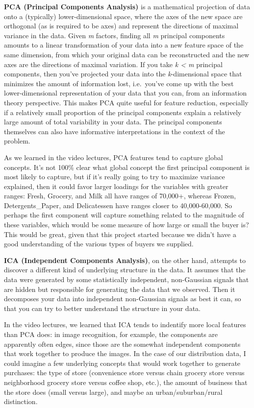 \documentclass{article}
\begin{document}
    \textbf{PCA (Principal Components Analysis)} is a mathematical
projection of data onto a (typically) lower-dimensional space, where the
axes of the new space are orthogonal (as is required to be axes) and
represent the directions of maximal variance in the data. Given \emph{m}
factors, finding all \emph{m} principal components amounts to a linear
transformation of your data into a new feature space of the same
dimension, from which your original data can be reconstructed and the
new axes are the directions of maximal variation. If you take \emph{k
\textless{} m} principal components, then you've projected your data
into the \emph{k}-dimensional space that minimizes the amount of
information lost, i.e.~you've come up with the best lower-dimensional
representation of your data that you can, from an information theory
perspective. This makes PCA quite useful for feature reduction,
especially if a relatively small proportion of the principal components
explain a relatively large amount of total variability in your data. The
principal components themselves can also have informative
interpretations in the context of the problem.

As we learned in the video lectures, PCA features tend to capture global
concepts. It's not 100\% clear what global concept the first principal
component is most likely to capture, but if it's really going to try to
maximize variance explained, then it could favor larger loadings for the
variables with greater ranges: Fresh, Grocery, and Milk all have ranges
of 70,000+, whereas Frozen, Detergents\_Paper, and Delicatessen have
ranges closer to 40,000-60,000. So perhaps the first component will
capture something related to the magnitude of these variables, which
would be some measure of how large or small the buyer is? This would be
great, given that this project started because we didn't have a good
understanding of the various types of buyers we supplied.

    \textbf{ICA (Independent Components Analysis)}, on the other hand,
attempts to discover a different kind of underlying structure in the
data. It assumes that the data were generated by some statistically
independent, non-Gaussian signals that are hidden but responsible for
generating the data that we observed. Then it decomposes your data into
independent non-Gaussian signals as best it can, so that you can try to
better understand the structure in your data.

In the video lectures, we learned that ICA tends to indentify more local
features than PCA does: in image recognition, for example, the
components are apparently often edges, since those are the somewhat
independent components that work together to produce the images. In the
case of our distribution data, I could imagine a few underlying concepts
that would work together to generate purchases: the type of store
(convenience store versus chain grocery store versus neighborhood
grocery store versus coffee shop, etc.), the amount of business that the
store does (small versus large), and maybe an urban/suburban/rural
distinction.
\end{document}
